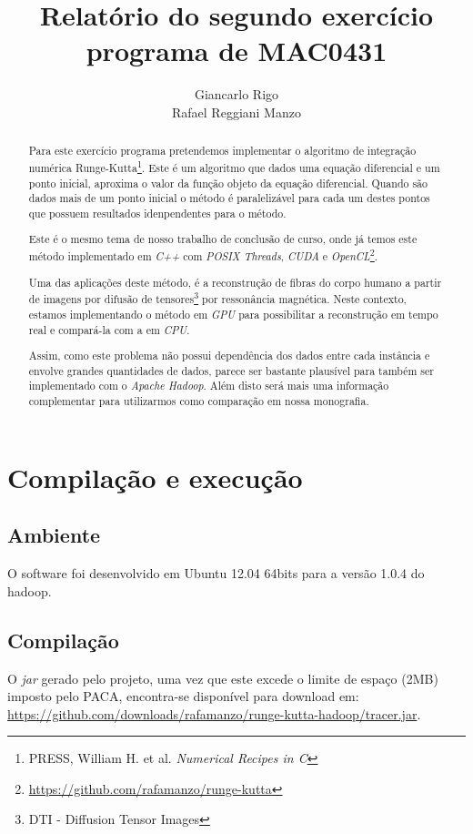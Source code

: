 \documentclass[a4paper,11pt]{report}
\title{Relatório do segundo exercício programa de MAC0431}
\author{Giancarlo Rigo\\
        Rafael Reggiani Manzo}
\begin{document}
\maketitle
\tableofcontents

\begin{abstract}
Para este exercício programa pretendemos implementar o algoritmo de integração numérica Runge-Kutta\footnote{PRESS, William H. et al. \textit{Numerical Recipes in C}}. Este é um algoritmo que dados uma equação diferencial e um ponto inicial, aproxima o valor da função objeto da equação diferencial. Quando são dados mais de um ponto inicial o método é paralelizável para cada um destes pontos que possuem resultados idenpendentes para o método.

Este é o mesmo tema de nosso trabalho de conclusão de curso, onde já temos este método implementado em \textit{C++} com \textit{POSIX Threads}, \textit{CUDA} e \textit{OpenCL}\footnote{\href{https://github.com/rafamanzo/runge-kutta}{https://github.com/rafamanzo/runge-kutta}}.

Uma das aplicações deste método, é a reconstrução de fibras do corpo humano a partir de imagens por difusão de tensores\footnote{DTI - Diffusion Tensor Images} por ressonância magnética. Neste contexto, estamos implementando o método em \textit{GPU} para possibilitar a reconstrução em tempo real e compará-la com a em \textit{CPU}.

Assim, como este problema não possui dependência dos dados entre cada instância e envolve grandes quantidades de dados, parece ser bastante plausível para também ser implementado com o \textit{Apache Hadoop}. Além disto será mais uma informação complementar para utilizarmos como comparação em nossa monografia.
\end{abstract}

\chapter{Compilação e execução}

\section{Ambiente}
O software foi desenvolvido em Ubuntu 12.04 64bits para a versão 1.0.4 do hadoop.

\section{Compilação}
O \textit{jar} gerado pelo projeto, uma vez que este excede o limite de espaço (2MB) imposto pelo PACA, encontra-se disponível para download em:\\ \href{https://github.com/downloads/rafamanzo/runge-kutta-hadoop/tracer.jar}{https://github.com/downloads/rafamanzo/runge-kutta-hadoop/tracer.jar}.
\end{document}

